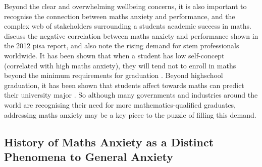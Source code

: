 \documentclass[14pt]{memoir}
\begin{document}
Beyond the clear and overwhelming wellbeing concerns, it is also important to recognise the connection between maths anxiety and performance, and the complex web of stakeholders surrounding a students academic success in maths.  discuss the negative correlation between maths anxiety and performance shown in the 2012 \gls{pisa} \cite{PISA2013} report, and also note the rising demand for \gls{stem} professionals worldwide. It has been shown that when a student has low self-concept (correlated with high maths anxiety), they will tend not to enroll in maths beyond the minimum requirements for graduation \cite{Ashcraft2007book}. Beyond highschool graduation, it has been shown that students affect towards maths can predict their university major \cite{LeFevre1992}. So although many governments and industries around the world are recognising their need for more mathematics-qualified graduates, addressing maths anxiety may be a key piece to the puzzle of filling this demand.

%

\subsection*{History of Maths Anxiety as a Distinct Phenomena to General Anxiety}
\end{document}

